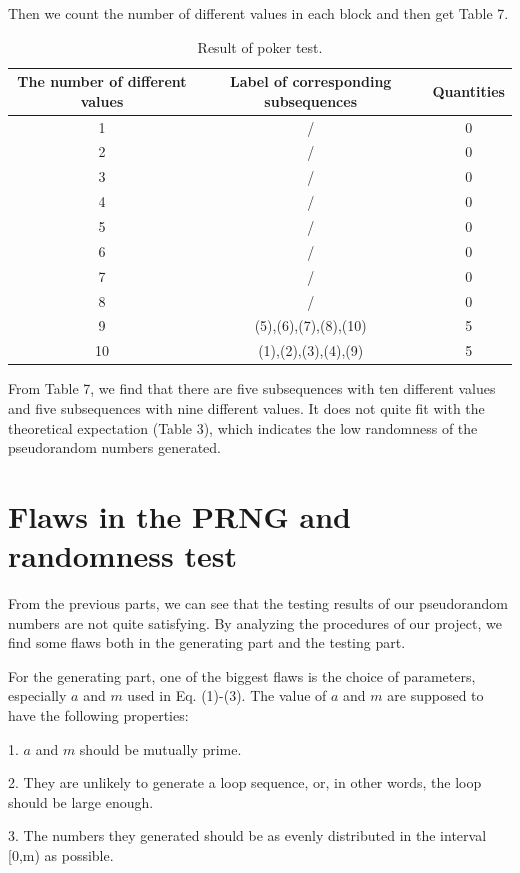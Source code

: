 \documentclass[a4paper]{article}
\begin{document}
	Then we count the number of different values in each block and then get Table 7.
	
	\begin{table}[H]
	\centering
	\begin{tabular}{|c|c|c|}
	\hline
	The number of different values&Label of corresponding subsequences&Quantities\\
	\hline
	1&/&0\\
	\hline
	2&/&0\\
	\hline
	3&/&0\\
	\hline
	4&/&0\\
	\hline
	5&/&0\\
	\hline
	6&/&0\\
	\hline
	7&/&0\\
	\hline
	8&/&0\\
	\hline
	9&(5),(6),(7),(8),(10)&5\\
	\hline
	10&(1),(2),(3),(4),(9)&5\\
	\hline
	\end{tabular}
	\caption{Result of poker test.}
	\end{table}	
	
	From Table 7, we find that there are five subsequences with ten different values and five subsequences with nine different values. It does not quite fit with the theoretical expectation (Table 3), which indicates the low randomness of the pseudorandom numbers generated.

\section{Flaws in the PRNG and randomness test}

	From the previous parts, we can see that the testing results of our pseudorandom numbers are not quite satisfying. By analyzing the procedures of our project, we find some flaws both in the generating part and the testing part.
	
	For the generating part, one of the biggest flaws is the choice of parameters, especially $a$ and $m$ used in Eq. (1)-(3). The value of $a$ and $m$ are supposed to have the following properties:
	
	1. $a$ and $m$ should be mutually prime.
	
	2. They are unlikely to generate a loop sequence, or, in other words, the loop should be large enough.
	
	3. The numbers they generated should be as evenly distributed in the interval [0,m) as possible.
	
\end{document}
